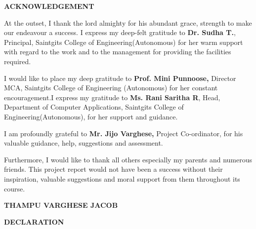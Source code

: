 \documentclass[12pt,a4paper]{report}
\begin{document}



\newpage
\thispagestyle{empty}

\begin{center}
{\fontsize{16pt}{18pt}\selectfont\textbf{ACKNOWLEDGEMENT}}

\end{center}

\vspace{1cm}

At the outset, I thank the lord almighty for his abundant grace, strength to make our endeavour a success. I express my deep-felt gratitude to \textbf{Dr. Sudha T.}, Principal, Saintgits College of Engineering(Autonomous) for her warm support with regard to the work and to the management for providing the facilities required.


I would like to place my deep gratitude to \textbf{Prof. Mini Punnoose,} Director MCA, Saintgits College of Engineering (Autonomous) for her constant encouragement.I express my gratitude to \textbf{Ms. Rani Saritha R}, Head, Department of Computer Applications, Saintgits College of Engineering(Autonomous), for her support and guidance.


I am profoundly grateful to \textbf{Mr. Jijo Varghese,} Project Co-ordinator, for his valuable guidance, help, suggestions and assessment.


Furthermore, I would like to thank all others especially my parents and numerous friends. This project report would not have been a success without their inspiration, valuable suggestions and moral support from them throughout its course.


\vspace{2cm}

\begin{flushright}
\textbf{THAMPU VARGHESE JACOB}
\end{flushright}

\newpage
\thispagestyle{empty}

\begin{center}
{\fontsize{16pt}{18pt}\selectfont\textbf{DECLARATION}}


\end{center}

\vspace{1cm}
\end{document}
